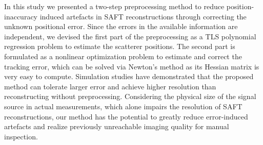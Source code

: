 In this study we presented a two-step preprocessing method to reduce position-inaccuracy induced artefacts in SAFT reconstructions through correcting the unknown positional error. 
Since the errors in the available information are independent, we devised the first part of the preprocessing as a TLS polynomial regression problem to estimate the scatterer positions. The second part is formulated as a nonlinear optimization problem to estimate and correct the tracking error, which can be solved via Newton's method as its Hessian matrix is very easy to compute. Simulation studies have demonstrated that the proposed method can tolerate larger error and achieve higher resolution than reconstructing without preprocessing. Considering the physical size of the signal source in actual measurements, which alone impairs the resolution of SAFT reconstructions, our method has the potential to greatly reduce error-induced artefacts and realize previously unreachable imaging quality for manual inspection. 